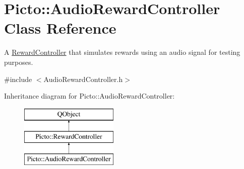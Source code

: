 \hypertarget{class_picto_1_1_audio_reward_controller}{\section{Picto\-:\-:Audio\-Reward\-Controller Class Reference}
\label{class_picto_1_1_audio_reward_controller}
}


A \hyperlink{class_picto_1_1_reward_controller}{Reward\-Controller} that simulates rewards using an audio signal for testing purposes.  




{\ttfamily \#include $<$Audio\-Reward\-Controller.\-h$>$}

Inheritance diagram for Picto\-:\-:Audio\-Reward\-Controller\-:\begin{figure}[H]
\begin{center}
\leavevmode
\includegraphics[height=3.000000cm]{class_picto_1_1_audio_reward_controller}
\end{center}
\end{figure}
